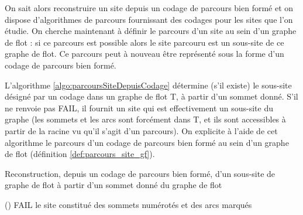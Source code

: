 On sait alors reconstruire un site depuis un codage de parcours bien formé et on dispose d'algorithmes de parcours fournissant des codages pour les sites que l'on étudie.
On cherche maintenant à définir le parcours d'un site au sein d'un graphe de flot : si ce parcours est possible alors le site parcouru est un sous-site de ce graphe de flot.
Ce parcours peut à nouveau être représenté sous la forme d'un codage de parcours bien formé.

L'algorithme \ref{algo:parcoursSiteDepuisCodage} détermine (s'il existe) le sous-site désigné par un codage dans un graphe de flot T, à partir d'un sommet donné. S'il ne renvoie pas FAIL, il fournit un site qui est effectivement un sous-site du graphe (les sommets et les arcs sont forcément dans T, et ils sont accessibles à partir de la racine vu qu'il s'agit d'un parcours).
On explicite à l'aide de cet algorithme le parcours d'un codage de parcours bien formé au sein d'un graphe de flot (définition \ref{def:parcours_site_gf}).

\begin{algorithm}[h] %
\caption{Reconstruction, depuis un codage de parcours bien formé, d'un sous-site de graphe de flot à partir d'un sommet donné du graphe de flot}
\SetAlgoLined
{}
\Fn(){}{
{
  \Return FAIL
}
  \Return le site constitué des sommets numérotés et des arcs marqués
}
\label{algo:parcoursSiteDepuisCodage}
\end{algorithm}

